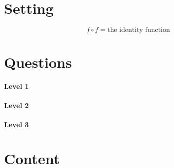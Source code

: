 \documentclass{ximera}
\begin{document}
\section{Setting}

\vfil

\[
f\circ f = \text{the identity function}
\]

\vfil

\vfil

\newpage


\section{Questions}

\paragraph{Level 1}

\paragraph{Level 2}

\paragraph{Level 3}


\section{Content}
\end{document}
